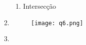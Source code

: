 \begin{enumerate}[label=\arabic*)]
\begin{enumerate}[label=\alph*)]
			\item Intersecção	
		\end{enumerate}				
		
		\item 
		
		\begin{figure}[H]
			\begin{minipage}[b]{0.35\linewidth}
			  \centering
			  \texttt{[image: q6.png]}
			\end{minipage}
		\end{figure}

		\item 
	\end{enumerate}
	
\newpage